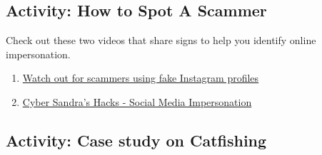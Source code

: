 \documentclass[
]{book}
\theoremstyle{definition}
\theoremstyle{definition}
\theoremstyle{definition}
\theoremstyle{definition}
\theoremstyle{remark}
\begin{document}
\hypertarget{activity-how-to-spot-a-scammer}{%
\subsection*{Activity: How to Spot A Scammer}\label{activity-how-to-spot-a-scammer}}

\begin{reflect}
Check out these two videos that share signs to help you identify online impersonation.

\begin{enumerate}
\def\labelenumi{\arabic{enumi}.}
\item
  \href{https://www.youtube.com/watch?v=F57DE05FpgQ}{Watch out for scammers using fake Instagram profiles}
\item
  \href{https://www.youtube.com/watch?v=Ta6qq7wnpcA}{Cyber Sandra's Hacks - Social Media Impersonation}
\end{enumerate}
\end{reflect}

\hypertarget{activity-case-study-on-catfishing}{%
\subsection*{Activity: Case study on Catfishing}\label{activity-case-study-on-catfishing}}
\end{document}
